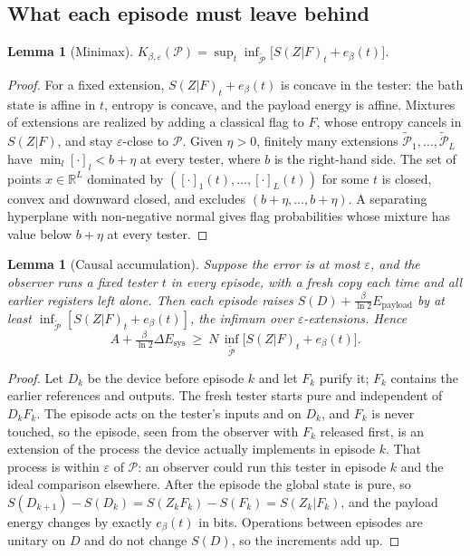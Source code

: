 \documentclass[11pt]{article}
\newtheorem{lemma}[theorem]{Lemma}
\theoremstyle{definition}
\theoremstyle{remark}
\newcommand{\Pp}{\mathcal P}
\newcommand{\Pt}{\widetilde{\mathcal P}}
\begin{document}
\subsection{What each episode must leave behind}

\begin{lemma}[Minimax]\label{lem:minimax}
$K_{\beta,\varepsilon}(\Pp)=\sup_t\inf_{\Pt}\bigl[S(Z|F)_t+e_\beta(t)\bigr]$.
\end{lemma}

\begin{proof}
For a fixed extension, $S(Z|F)_t+e_\beta(t)$ is concave in the tester: the bath state is affine in $t$, entropy is concave, and the payload energy is affine. Mixtures of extensions are realized by adding a classical flag to $F$, whose entropy cancels in $S(Z|F)$, and stay $\varepsilon$-close to $\Pp$. Given $\eta>0$, finitely many extensions $\Pt_1,\dots,\Pt_L$ have $\min_l[\cdot]_l<b+\eta$ at every tester, where $b$ is the right-hand side. The set of points $x\in\mathbb R^L$ dominated by $([\cdot]_1(t),\dots,[\cdot]_L(t))$ for some $t$ is closed, convex and downward closed, and excludes $(b+\eta,\dots,b+\eta)$. A separating hyperplane with non-negative normal gives flag probabilities whose mixture has value below $b+\eta$ at every tester.
\end{proof}

\begin{lemma}[Causal accumulation]\label{lem:accumulation}
Suppose the error is at most $\varepsilon$, and the observer runs a fixed tester $t$ in every episode, with a fresh copy each time and all earlier registers left alone. Then each episode raises $S(D)+\frac{\beta}{\ln2}E_{\mathrm{payload}}$ by at least $\inf_{\Pt}[S(Z|F)_t+e_\beta(t)]$, the infimum over $\varepsilon$-extensions. Hence
\[
A+\tfrac{\beta}{\ln2}\Delta E_{\mathrm{sys}}\ \ge\ N\,\inf_{\Pt}\bigl[S(Z|F)_t+e_\beta(t)\bigr].
\]
\end{lemma}

\begin{proof}
Let $D_k$ be the device before episode $k$ and let $F_k$ purify it; $F_k$ contains the earlier references and outputs. The fresh tester starts pure and independent of $D_kF_k$. The episode acts on the tester's inputs and on $D_k$, and $F_k$ is never touched, so the episode, seen from the observer with $F_k$ released first, is an extension of the process the device actually implements in episode $k$. That process is within $\varepsilon$ of $\Pp$: an observer could run this tester in episode $k$ and the ideal comparison elsewhere. After the episode the global state is pure, so $S(D_{k+1})-S(D_k)=S(Z_kF_k)-S(F_k)=S(Z_k|F_k)$, and the payload energy changes by exactly $e_\beta(t)$ in bits. Operations between episodes are unitary on $D$ and do not change $S(D)$, so the increments add up.
\end{proof}
\end{document}
